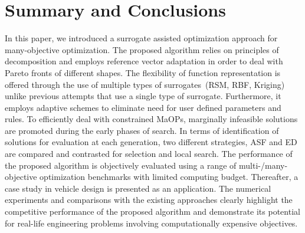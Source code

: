 \documentclass[twocolumn,10pt]{asme2ej}
\begin{document}
\section{Summary and Conclusions}
\label{sec:KHTsec:5}

In this paper, we introduced a surrogate assisted optimization approach for many-objective optimization. The proposed algorithm relies on principles of decomposition and employs reference vector adaptation in order to deal with Pareto fronts of different shapes. The flexibility of function representation is offered through the use of multiple types of surrogates~(RSM, RBF, Kriging) unlike previous attempts that use a single type of surrogate. Furthermore, it employs adaptive schemes to eliminate need for user defined parameters and rules. To efficiently deal with constrained MaOPs, marginally infeasible solutions are promoted during the early phases of search. In terms of identification of solutions for evaluation at each generation, two different strategies, ASF and ED are compared and contrasted for selection and local search. The performance of the proposed algorithm is objectively evaluated using a range of multi-/many-objective optimization benchmarks with limited computing budget. Thereafter, a case study in {\color{blue}vehicle design} is presented as an application. The numerical experiments and comparisons with the existing approaches clearly highlight the competitive performance of the proposed algorithm and demonstrate its potential for real-life engineering problems involving computationally expensive objectives.  

\scriptsize
 
\balance

\end{document}
